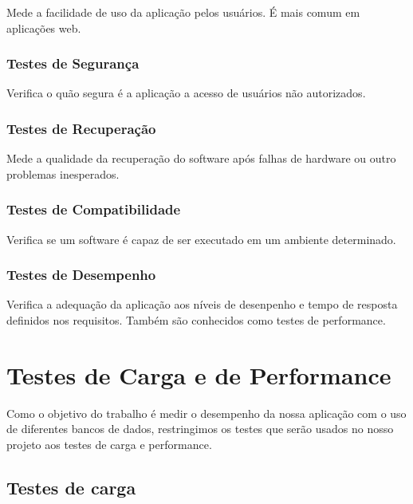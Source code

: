 Mede a facilidade de uso da aplicação pelos usuários. É mais comum em aplicações web.

\subsubsection{Testes de Segurança}

Verifica o quão segura é a aplicação a acesso de usuários não autorizados.

\subsubsection{Testes de Recuperação}

Mede a qualidade da recuperação do software após falhas de hardware ou outro problemas inesperados.

\subsubsection{Testes de Compatibilidade}

Verifica se um software é capaz de ser executado em um ambiente determinado.

\subsubsection{Testes de Desempenho}

Verifica a adequação da aplicação aos níveis de desenpenho e tempo de resposta definidos nos requisitos. Também são conhecidos como testes de performance.




\section{Testes de Carga e de Performance}

Como o objetivo do trabalho é medir o desempenho da nossa aplicação com o uso de diferentes bancos de dados, restringimos os testes que serão usados no nosso projeto aos testes de carga e performance.

\subsection{Testes de carga}

